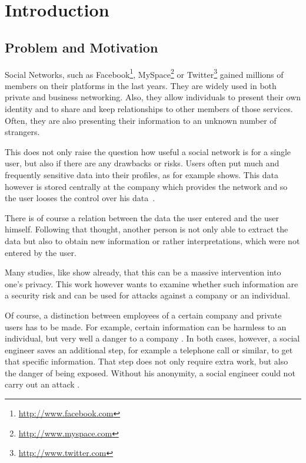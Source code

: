 \chapter{Introduction}
\label{chapter:introduction}

\section{Problem and Motivation}

Social Networks, such as Facebook\footnote{\url{http://www.facebook.com}},
MySpace\footnote{\url{http://www.myspace.com}} or
Twitter\footnote{\url{http://www.twitter.com}} gained millions of members on
their platforms in the last years. They are widely used in both private and
business networking. Also, they allow individuals to present their own identity
and to share and keep relationships to other members of those services. Often,
they are also presenting their information to an unknown number of strangers.

This does not only raise the question how useful a social network is for a
single user, but also if there are any drawbacks or risks.  Users often put
much and frequently sensitive data into their profiles, as for example
\cite{brown2008} shows.  This data however is stored centrally at the company
which provides the network and so the user looses the control over his
data~\cite{fraunhofer2008}.

There is of course a relation between the data the user entered and the user
himself. Following that thought, another person is not only able to extract the
data but also to obtain new information or rather interpretations, which were
not entered by the user.

Many studies, like \cite{fraunhofer2008,gross2005} show already, that this can
be a massive intervention into one's privacy. This work however wants to examine
whether such information are a security risk and can be used for attacks
against a company or an individual.

Of course, a distinction between employees of a certain company and private
users has to be made. For example, certain information can be harmless to an
individual, but very well a danger to a company \cite{mitnick2003}. In both
cases, however, a social engineer saves an additional step, for example a
telephone call or similar, to get that specific information. That step does not
only require extra work, but also the danger of being exposed. Without his
anonymity, a social engineer could not carry out an attack \cite{mitnick2003}.

